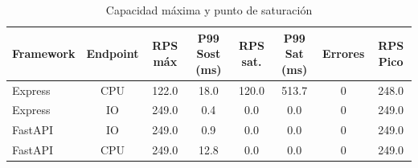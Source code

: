 \begin{table}[h]
\centering
\caption{Capacidad máxima y punto de saturación}
\label{tab:capacidad}
\begin{tabular}{lccccccc}
\hline
Framework & Endpoint & RPS máx & P99 Sost (ms) & RPS sat. & P99 Sat (ms) & Errores & RPS Pico \\
\hline
Express & CPU & 122.0 & 18.0 & 120.0 & 513.7 & 0 & 248.0 \\
Express & IO & 249.0 & 0.4 & 0.0 & 0.0 & 0 & 249.0 \\
FastAPI & IO & 249.0 & 0.9 & 0.0 & 0.0 & 0 & 249.0 \\
FastAPI & CPU & 249.0 & 12.8 & 0.0 & 0.0 & 0 & 249.0 \\
\hline
\end{tabular}
\end{table}
